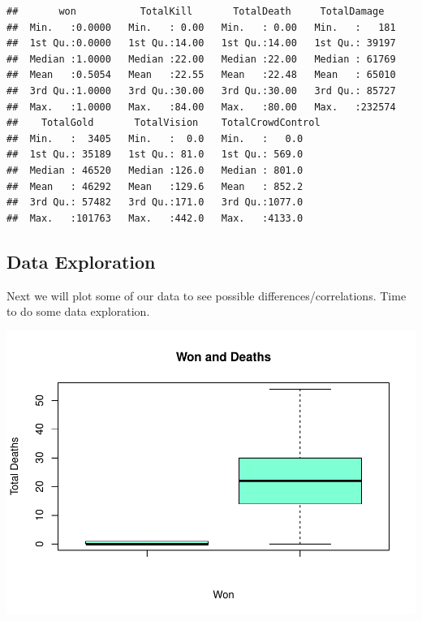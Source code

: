 \documentclass[
]{article}
\newenvironment{Shaded}{\begin{snugshade}}{\end{snugshade}}
\newcommand{\AttributeTok}[1]{\textcolor[rgb]{0.77,0.63,0.00}{#1}}
\newcommand{\ConstantTok}[1]{\textcolor[rgb]{0.00,0.00,0.00}{#1}}
\newcommand{\FunctionTok}[1]{\textcolor[rgb]{0.00,0.00,0.00}{#1}}
\newcommand{\NormalTok}[1]{#1}
\newcommand{\SpecialCharTok}[1]{\textcolor[rgb]{0.00,0.00,0.00}{#1}}
\newcommand{\StringTok}[1]{\textcolor[rgb]{0.31,0.60,0.02}{#1}}
\begin{document}
\begin{verbatim}
##       won           TotalKill       TotalDeath     TotalDamage    
##  Min.   :0.0000   Min.   : 0.00   Min.   : 0.00   Min.   :   181  
##  1st Qu.:0.0000   1st Qu.:14.00   1st Qu.:14.00   1st Qu.: 39197  
##  Median :1.0000   Median :22.00   Median :22.00   Median : 61769  
##  Mean   :0.5054   Mean   :22.55   Mean   :22.48   Mean   : 65010  
##  3rd Qu.:1.0000   3rd Qu.:30.00   3rd Qu.:30.00   3rd Qu.: 85727  
##  Max.   :1.0000   Max.   :84.00   Max.   :80.00   Max.   :232574  
##    TotalGold       TotalVision    TotalCrowdControl
##  Min.   :  3405   Min.   :  0.0   Min.   :   0.0   
##  1st Qu.: 35189   1st Qu.: 81.0   1st Qu.: 569.0   
##  Median : 46520   Median :126.0   Median : 801.0   
##  Mean   : 46292   Mean   :129.6   Mean   : 852.2   
##  3rd Qu.: 57482   3rd Qu.:171.0   3rd Qu.:1077.0   
##  Max.   :101763   Max.   :442.0   Max.   :4133.0
\end{verbatim}

\hypertarget{data-exploration}{%
\subsection{Data Exploration}\label{data-exploration}}

Next we will plot some of our data to see possible
differences/correlations. Time to do some data exploration.

\begin{Shaded}
\end{Shaded}

\includegraphics{Regression_files/figure-latex/unnamed-chunk-5-1.pdf}
\end{document}
